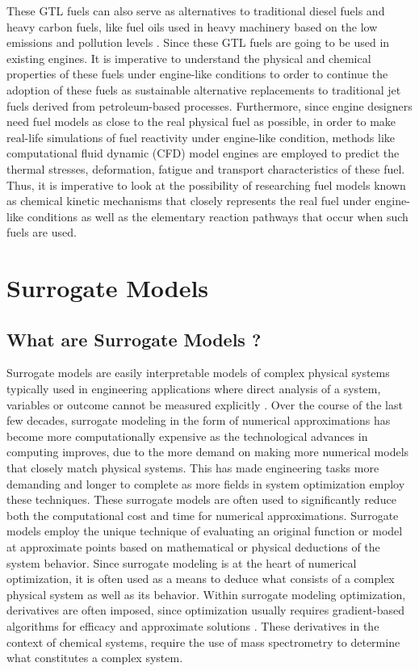 These GTL fuels can also serve as alternatives to traditional diesel fuels and heavy carbon fuels, like fuel oils used in heavy machinery based on the low emissions and pollution levels \cite{Timko2010ParticulateFuel}. Since these GTL fuels are going to be used in existing engines. It is imperative to understand the physical and chemical properties of these fuels under engine-like conditions to order to continue the adoption of these fuels as sustainable alternative replacements to traditional jet fuels derived from petroleum-based processes. Furthermore, since engine designers need fuel models as close to the real physical fuel as possible, in order to make real-life simulations of fuel reactivity under engine-like condition, methods like computational fluid dynamic (CFD) model engines are employed to predict the thermal stresses, deformation, fatigue and transport characteristics of these fuel. Thus, it is imperative to look at the possibility of researching fuel models known as chemical kinetic mechanisms that closely represents the real fuel under engine-like conditions as well as the elementary reaction pathways that occur when such fuels are used.


\section{Surrogate Models}
\subsection{What are Surrogate Models ?}
Surrogate models are easily interpretable models of complex physical systems typically used in engineering applications where direct analysis of a system, variables or outcome cannot be measured explicitly \cite{molnar2019}. 
Over the course of the last few decades, surrogate modeling in the form of numerical approximations has become more computationally expensive as the technological advances in computing improves, due to the more demand on making more numerical models that closely match physical systems. This has made engineering tasks more demanding and longer to complete as more fields in system optimization employ these techniques. These surrogate models are often used to significantly reduce both the computational cost and time for numerical approximations. Surrogate models employ the unique technique of evaluating an original function or model at approximate points based on mathematical or physical deductions of the system behavior. Since surrogate modeling is at the heart of numerical optimization, it is often used as a means to deduce what consists of a complex physical system as well as its behavior. Within surrogate modeling optimization, derivatives are often imposed, since optimization usually requires gradient-based algorithms for efficacy and approximate solutions \cite{Bouhlel2019ADerivatives}. These derivatives in the context of chemical systems, require the use of mass spectrometry to determine what constitutes a complex system.

